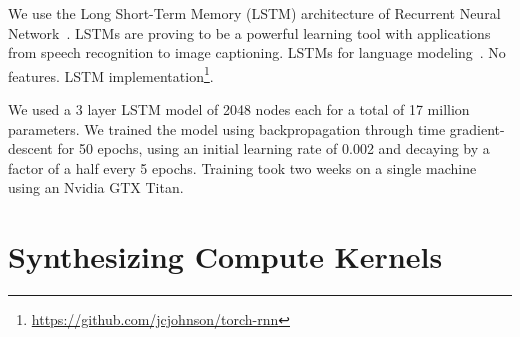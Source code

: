 \documentclass[preprint,nonatbib,10pt,nocopyrightspace]{sigplanconf}
\begin{document}

We use the Long Short-Term Memory (LSTM) architecture of Recurrent
Neural Network~\cite{Hochreiter1997,Mikolov2015}. LSTMs are proving to
be a powerful learning tool with applications from speech recognition
to image captioning. LSTMs for language
modeling~\cite{Sundermeyer2012}. No features. LSTM
implementation\footnote{\url{https://github.com/jcjohnson/torch-rnn}}.

%
%
%
%
We used a 3 layer LSTM model of 2048 nodes each for a total of 17
million parameters. We trained the model using backpropagation through
time gradient-descent for 50 epochs, using an initial learning rate of
0.002 and decaying by a factor of a half every 5 epochs. Training took
two weeks on a single machine using an Nvidia GTX Titan.



\section{Synthesizing Compute Kernels}\label{sec:}
\end{document}
